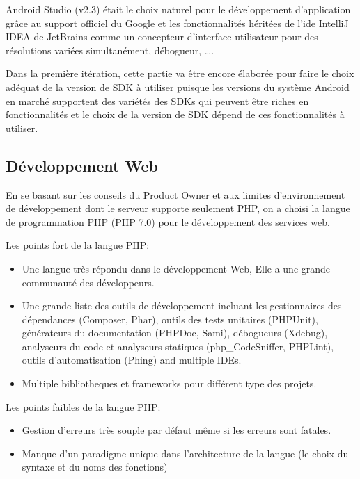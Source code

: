 Android Studio (v2.3) était le choix naturel pour le développement
d'application grâce au support officiel du Google et les fonctionnalités
héritées de l'ide IntelliJ IDEA de JetBrains comme un concepteur d'interface
utilisateur pour des résolutions variées simultanément, débogueur, \ldots.

Dans la première itération, cette partie va être encore élaborée pour faire le
choix adéquat de la version de SDK à utiliser puisque les versions du système
Android en marché supportent des variétés des SDKs qui peuvent être riches en
fonctionnalités et le choix de la version de SDK dépend de ces fonctionnalités
à utiliser.

\subsection{Développement Web}

En se basant sur les conseils du Product Owner et aux limites d'environnement
de développement dont le serveur supporte seulement PHP, on a choisi la langue
de programmation PHP (PHP 7.0) pour le développement des services web.

Les points fort de la langue PHP:

\begin{itemize}
    \item Une langue très répondu dans le développement Web, Elle a une
        grande communauté des développeurs.
    \item Une grande liste des outils de développement incluant les
        gestionnaires des dépendances (Composer, Phar), outils des tests
        unitaires (PHPUnit), générateurs du documentation (PHPDoc, Sami),
        débogueurs (Xdebug), analyseurs du code et analyseurs statiques
        (php\_CodeSniffer, PHPLint), outils d'automatisation (Phing) and
        multiple IDEs.
    \item Multiple bibliotheques et frameworks pour différent type des projets.
\end{itemize}

Les points faibles de la langue PHP:

\begin{itemize}
    \item Gestion d'erreurs très souple par défaut même si les erreurs sont
        fatales.
    \item Manque d'un paradigme unique dans l'architecture de la langue (le
        choix du syntaxe et du noms des fonctions)
\end{itemize}

